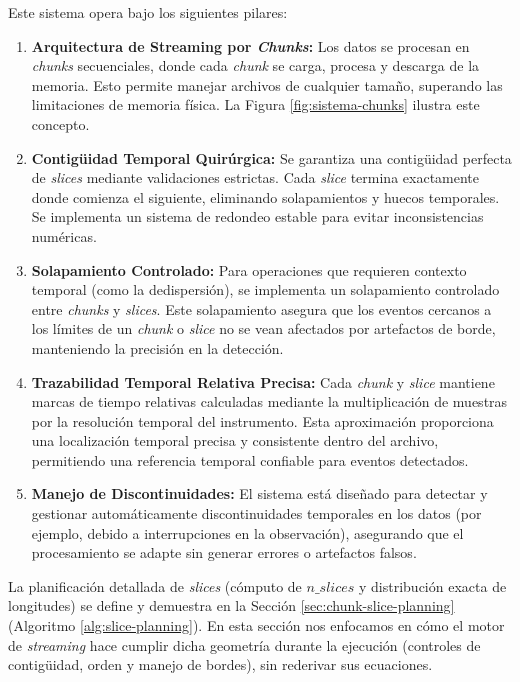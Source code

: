 Este sistema opera bajo los siguientes pilares:
\begin{enumerate}
    \item \textbf{Arquitectura de Streaming por \emph{Chunks}:} Los datos se procesan en \emph{chunks} secuenciales, donde cada \emph{chunk} se carga, procesa y descarga de la memoria. Esto permite manejar archivos de cualquier tamaño, superando las limitaciones de memoria física. La Figura \ref{fig:sistema-chunks} ilustra este concepto.
    \item \textbf{Contigüidad Temporal Quirúrgica:} Se garantiza una contigüidad perfecta de \emph{slices} mediante validaciones estrictas. Cada \emph{slice} termina exactamente donde comienza el siguiente, eliminando solapamientos y huecos temporales. Se implementa un sistema de redondeo estable para evitar inconsistencias numéricas.
    \item \textbf{Solapamiento Controlado:} Para operaciones que requieren contexto temporal (como la dedispersión), se implementa un solapamiento controlado entre \emph{chunks} y \emph{slices}. Este solapamiento asegura que los eventos cercanos a los límites de un \emph{chunk} o \emph{slice} no se vean afectados por artefactos de borde, manteniendo la precisión en la detección.
    \item \textbf{Trazabilidad Temporal Relativa Precisa:} Cada \emph{chunk} y \emph{slice} mantiene marcas de tiempo relativas calculadas mediante la multiplicación de muestras por la resolución temporal del instrumento. Esta aproximación proporciona una localización temporal precisa y consistente dentro del archivo, permitiendo una referencia temporal confiable para eventos detectados.
    \item \textbf{Manejo de Discontinuidades:} El sistema está diseñado para detectar y gestionar automáticamente discontinuidades temporales en los datos (por ejemplo, debido a interrupciones en la observación), asegurando que el procesamiento se adapte sin generar errores o artefactos falsos.
\end{enumerate}

La planificación detallada de \emph{slices} (cómputo de $n\_slices$ y distribución exacta de longitudes) se define y demuestra en la Sección \ref{sec:chunk-slice-planning} (Algoritmo \ref{alg:slice-planning}). En esta sección nos enfocamos en cómo el motor de \emph{streaming} hace cumplir dicha geometría durante la ejecución (controles de contigüidad, orden y manejo de bordes), sin rederivar sus ecuaciones.

